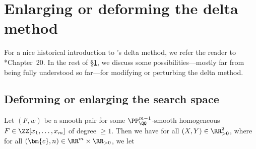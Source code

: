 \documentclass[12pt]{report}
\begin{document}

\section{Enlarging or deforming the delta method}
\label{SEC:possibly-averaging-deforming-enlarging-or-smoothing-the-delta-method}

For a nice historical introduction to \cites{duke1993bounds,heath1996new}'s delta method,
we refer the reader to \cite{iwaniec2004analytic}*{Chapter~20}.
In the rest of \S\ref{SEC:possibly-averaging-deforming-enlarging-or-smoothing-the-delta-method},
we discuss some possibilities---mostly far from being fully understood so far---for modifying or perturbing the delta method.

\subsection{Deforming or enlarging the search space}

Let $(F,w)$ be a smooth pair for some $\PP^{m-1}_\QQ$-smooth homogeneous $F\in \ZZ[x_1,\dots,x_m]$ of degree $\geq 1$.
Then we have
for all $(X,Y)\in\RR_{>0}^2$,
where for all $(\bm{c},n)\in\RR^m\times\RR_{>0}$,
we let
\end{document}
